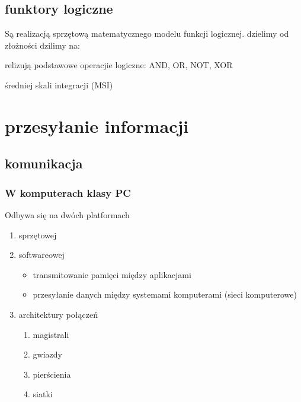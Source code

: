 \documentclass[11pt]{article}
\begin{document}
\subsection{funktory logiczne}
\label{sec:orgd146528}
Są realizacją sprzętową matematycznego modelu funkcji logicznej.
dzielimy od złożności dzilimy na:
\begin{description}
\item[{Układy małe skali integracji (SSI)}] relizują podstawowe operacjie logiczne: AND, OR, NOT, XOR
\item średniej skali integracji (MSI)
\end{description}
\section{przesyłanie informacji}
\label{sec:orgdfa6454}
\subsection{komunikacja}
\label{sec:orgd53e5f5}
\subsubsection{W komputerach klasy PC}
\label{sec:orge06e8c5}
Odbywa się na dwóch platformach
\begin{enumerate}
\item sprzętowej
\label{sec:org1c32111}
\item softwareowej
\label{sec:orgc5b1e29}
\begin{itemize}
\item transmitowanie pamięci między aplikacjami
\item przesyłanie danych między systemami komputerami (sieci komputerowe)
\end{itemize}
\item architektury połączeń
\label{sec:org51c18d5}
\begin{enumerate}
\item magistrali
\label{sec:org4618fc4}
\item gwiazdy
\label{sec:org0ca1f36}
\item pierścienia
\label{sec:orgc867eba}
\item siatki
\label{sec:org612c563}
\end{enumerate}
\end{enumerate}
\end{document}
